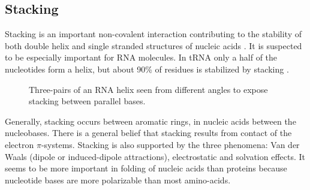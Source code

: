 \documentclass[12pt]{article}
\begin{document}
\subsection{Stacking}
\label{stacking-section}
Stacking is an important non-covalent interaction contributing to the stability of both double helix and single stranded structures of nucleic acids \cite{Hobza2008}. It is suspected to be especially important for RNA molecules. In tRNA only a half of the nucleotides form a helix, but about 90\% of residues is stabilized by stacking \cite{Bloomfield1999}. 
\begin{figure} [h!]
\begin{center}
\caption{Three-pairs of an RNA helix seen from different angles to expose  stacking between parallel bases.}
\label{StackingHelix}
\end{center}
\end{figure} 
Generally, stacking occurs between aromatic rings, in nucleic acids between the nucleobases. There is a general belief that stacking results from contact of the electron $\pi$-systems. Stacking is also supported by the three phenomena: Van der Waals (dipole or induced-dipole attractions), electrostatic and solvation effects. It seems to be more important in folding of nucleic acids than proteins because nucleotide bases are more polarizable than most amino-acids. 
\end{document}
